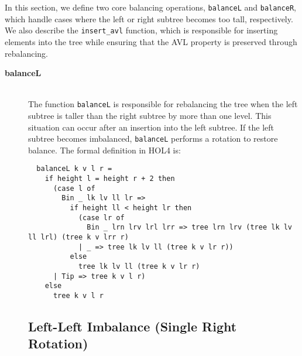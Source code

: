 \documentclass[12pt]{article}
\begin{document}
\begin{itemize}
In this section, we define two core balancing operations, \texttt{balanceL} and \texttt{balanceR}, which handle cases where the left or right subtree becomes too tall, respectively. We also describe the \texttt{insert\_avl} function, which is responsible for inserting elements into the tree while ensuring that the AVL property is preserved through rebalancing.

\begin{description}

  \item[\textbf{balanceL}] \\
  The function \texttt{balanceL} is responsible for rebalancing the tree when the left subtree is taller than the right subtree by more than one level. This situation can occur after an insertion into the left subtree. If the left subtree becomes imbalanced, \texttt{balanceL} performs a rotation to restore balance. The formal definition in HOL4 is:
  \begin{verbatim}
  balanceL k v l r =
    if height l = height r + 2 then
      (case l of
        Bin _ lk lv ll lr =>
          if height ll < height lr then
            (case lr of
              Bin _ lrn lrv lrl lrr => tree lrn lrv (tree lk lv ll lrl) (tree k v lrr r)
            | _ => tree lk lv ll (tree k v lr r))
          else
            tree lk lv ll (tree k v lr r)
      | Tip => tree k v l r)
    else
      tree k v l r
  \end{verbatim}

  \subsection*{Left-Left Imbalance (Single Right Rotation)}
\begin{center}
\end{center}


\end{description}
\end{itemize}
\end{document}
